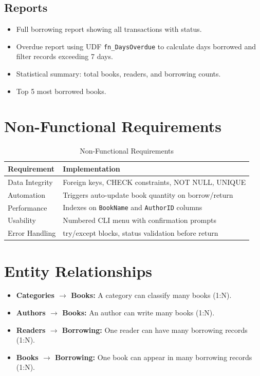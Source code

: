 \documentclass[12pt,a4paper,oneside]{report}
\begin{document}
\subsection*{Reports}
\begin{itemize}
  \item Full borrowing report showing all transactions with status.
  \item Overdue report using UDF \texttt{fn\_DaysOverdue} to calculate days borrowed
        and filter records exceeding 7 days.
  \item Statistical summary: total books, readers, and borrowing counts.
  \item Top 5 most borrowed books.
\end{itemize}

\section{Non-Functional Requirements}

\begin{table}[H]
  \centering
  \caption{Non-Functional Requirements}
  \begin{tabularx}{\linewidth}{L{3.5cm} X}
    \toprule
    \textbf{Requirement} & \textbf{Implementation} \\
    \midrule
    Data Integrity & Foreign keys, CHECK constraints, NOT NULL, UNIQUE \\
    Automation     & Triggers auto-update book quantity on borrow/return \\
    Performance    & Indexes on \texttt{BookName} and \texttt{AuthorID} columns \\
    Usability      & Numbered CLI menu with confirmation prompts \\
    Error Handling & try/except blocks, status validation before return \\
    \bottomrule
  \end{tabularx}
\end{table}

\section{Entity Relationships}

\begin{itemize}
  \item \textbf{Categories $\rightarrow$ Books:} A category can classify many books (1:N).
  \item \textbf{Authors $\rightarrow$ Books:} An author can write many books (1:N).
  \item \textbf{Readers $\rightarrow$ Borrowing:} One reader can have many borrowing records (1:N).
  \item \textbf{Books $\rightarrow$ Borrowing:} One book can appear in many borrowing records (1:N).
\end{itemize}
\end{document}

